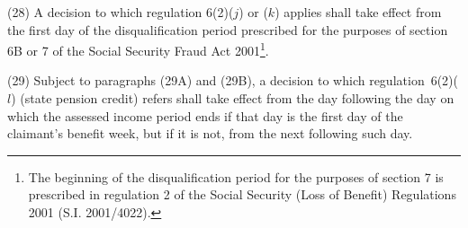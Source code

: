 \documentclass[12pt,a4paper]{article}
\begin{document}
%
%
%
%
%
%
%

(28) A decision to which regulation 6(2)($j$)  or ($k$)  applies shall take effect from the first day of the disqualification period prescribed for the purposes of section 
6B or  %
7 of the Social Security Fraud Act 2001\footnote{The beginning of the disqualification period for the purposes of section 7 is prescribed in regulation 2 of the Social Security (Loss of Benefit) Regulations 2001 (S.I. 2001/4022).}.

(29) 
Subject to paragraphs (29A) and (29B), a  %
decision to which regulation~6(2)($l$) (state pension credit) refers shall take effect from the day following the day on which the assessed income period ends if that day is the first day of the claimant’s benefit week, but if it is not, from the next following such day.
\end{document}
